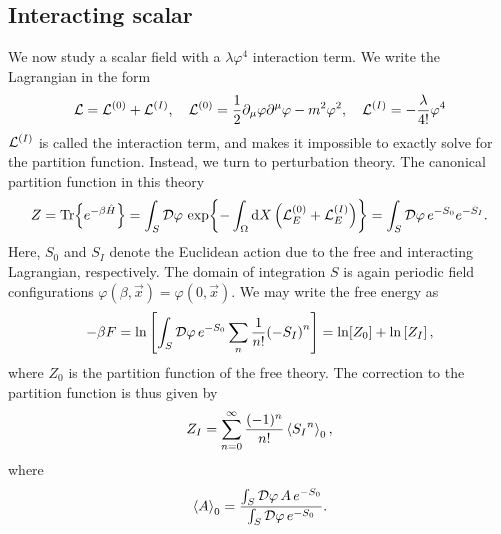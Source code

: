 \subsection{Interacting scalar}

We now study a scalar field with a $\lambda \varphi^4$ interaction term.
We write the Lagrangian in the form
\begin{equation*}
    \mathcal{L} = \mathcal{L}^{(0)} + \mathcal{L}^{(I)}, \quad 
    \mathcal{L}^{(0)} = 
    \frac{1}{2} \partial_\mu \varphi \partial^\mu \varphi - m^2 \varphi^2 , \quad
    \mathcal{L}^{(I)} = - \frac{\lambda}{4!} \varphi^4
\end{equation*}
$\mathcal{L}^{(I)}$ is called the interaction term, and makes it impossible to exactly solve for the partition function.
Instead, we turn to perturbation theory.
The canonical partition function in this theory
\begin{equation}
    Z = \Tr{e^{- \beta \hat H}}
    = \int_S \mathcal{D} \varphi \, \exp{
        - \int_\Omega \dd X \left(\mathcal{L}_E^{(0)} + \mathcal{L}_E^{(I)}\right)
    }
    = \int_S \mathcal{D} \varphi \, e^{-S_0} e^{-S_I}.
\end{equation}
Here, $S_0$ and $S_I$ denote the Euclidean action due to the free and interacting Lagrangian, respectively.
The domain of integration $S$ is again periodic field configurations $\varphi(\beta, \vec x) = \varphi(0, \vec x)$.
We may write the free energy as
\begin{equation*}
    - \beta F = \ln
    \left[
        \int_S \mathcal{D} \varphi \, e^{-S_0} \sum_n \frac{1}{n!} {(-S_I)}^n
    \right]
    = \ln[Z_0] 
    + \ln
    \left[
        Z_I
    \right],
\end{equation*}
where $Z_0$ is the partition function of the free theory.
The correction to the partition function is thus given by
\begin{equation}
    Z_I = \sum_{n=0}^\infty \frac{(-1)^n}{n!} \ex{{S_I}^n}_0,
\end{equation}
where
\begin{equation}
    \ex{A}_0 = \frac{
        \int_S \D \varphi \, A \, e^{-S_0} }
    {\int_S \D \varphi \, e^{-S_0}}.
\end{equation}
